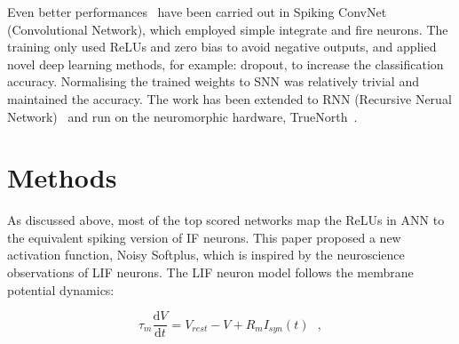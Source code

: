 \documentclass[runningheads,a4paper]{llncs}
\def\D{\mathrm{d}}
\begin{document}
Even better performances~\cite{cao2015spiking,diehl2015fast} have been carried out in Spiking ConvNet (Convolutional Network), which employed simple integrate and fire neurons.
The training only used ReLUs and zero bias to avoid negative outputs, and applied novel deep learning methods, for example: dropout, to increase the classification accuracy.
Normalising the trained weights to SNN was relatively trivial and maintained the accuracy.
The work has been extended to RNN (Recursive Nerual Network)~\cite{diehl2016conversion} and run on the neuromorphic hardware, TrueNorth~\cite{merolla2014million}.
 

\section{Methods}
As discussed above, most of the top scored networks map the ReLUs in ANN to 
the equivalent spiking version of IF neurons.
This paper proposed a new activation function, Noisy Softplus, which is inspired by the neuroscience observations of LIF neurons.
The LIF neuron model follows the membrane potential dynamics:

\begin{equation}
\tau_m \frac{\D V}{\D t}=V_{rest} - V + R_{m} I_{syn}(t) ~~~,
\label{eq:LIF}
\end{equation}
\end{document}
